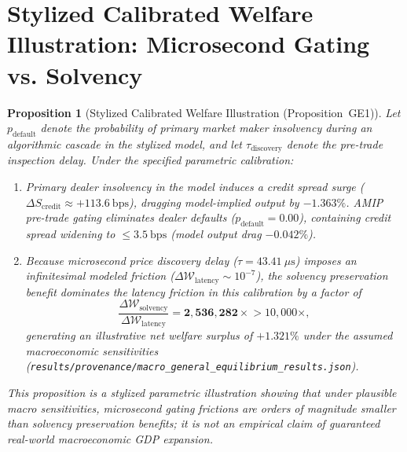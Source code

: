 \documentclass[11pt,a4paper]{article}
\newtheorem{proposition}[theorem]{Proposition}
\theoremstyle{definition}\newtheorem{definition}[theorem]{Definition}
\theoremstyle{remark}\newtheorem{remark}[theorem]{Remark}
\begin{document}
\section{Stylized Calibrated Welfare Illustration: Microsecond Gating vs. Solvency}
\label{sec:supp_macro_welfare}
\begin{proposition}[Stylized Calibrated Welfare Illustration (Proposition~GE1)]\label{thm:supp_ge1}
Let $p_{\text{default}}$ denote the probability of primary market maker insolvency during an algorithmic cascade in the stylized model, and let $\tau_{\text{discovery}}$ denote the pre-trade inspection delay. Under the specified parametric calibration:
\begin{enumerate}
    \item Primary dealer insolvency in the model induces a credit spread surge ($\Delta S_{\text{credit}} \approx +113.6~\text{bps}$), dragging model-implied output by $-1.363\%$. AMIP pre-trade gating eliminates dealer defaults ($p_{\text{default}} = 0.00$), containing credit spread widening to $\le 3.5~\text{bps}$ (model output drag $-0.042\%$).
    \item Because microsecond price discovery delay ($\tau = 43.41~\mu\text{s}$) imposes an infinitesimal modeled friction ($\Delta \mathcal{W}_{\text{latency}} \sim 10^{-7}$), the solvency preservation benefit dominates the latency friction in this calibration by a factor of
    \begin{equation}
    \frac{\Delta \mathcal{W}_{\text{solvency}}}{\Delta \mathcal{W}_{\text{latency}}} = \mathbf{2,536,282\times} > 10{,}000\times,
    \end{equation}
    generating an illustrative net welfare surplus of $\mathbf{+1.321\%}$ under the assumed macroeconomic sensitivities (\texttt{results/provenance/macro\_general\_equilibrium\_results.json}).
\end{enumerate}
This proposition is a stylized parametric illustration showing that under plausible macro sensitivities, microsecond gating frictions are orders of magnitude smaller than solvency preservation benefits; it is not an empirical claim of guaranteed real-world macroeconomic GDP expansion.
\end{proposition}
\end{document}
